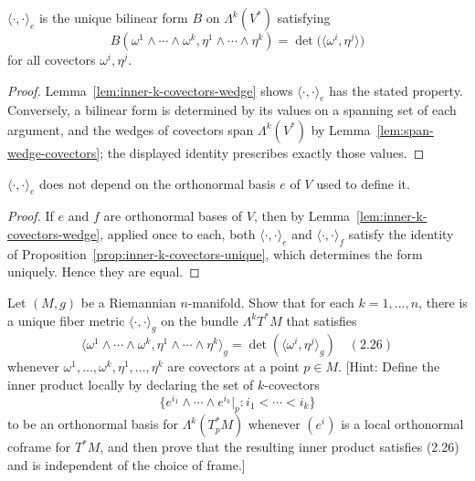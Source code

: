 \begin{proposition}
\label{prop:inner-k-covectors-unique}
\leanok
{}
$\langle \cdot, \cdot \rangle_e$ is the unique bilinear form $B$ on $\Lambda^k(V^*)$ satisfying
\[
B(\omega^1 \wedge \cdots \wedge \omega^k, \eta^1 \wedge \cdots \wedge \eta^k) = \det\big(\langle \omega^i, \eta^j\rangle\big)
\]
for all covectors $\omega^i, \eta^j$.
\end{proposition}
\begin{proof}
\leanok
{}
Lemma~\ref{lem:inner-k-covectors-wedge} shows $\langle \cdot, \cdot \rangle_e$ has the stated property. Conversely, a bilinear form is determined by its values on a spanning set of each argument, and the wedges of covectors span $\Lambda^k(V^*)$ by Lemma~\ref{lem:span-wedge-covectors}; the displayed identity prescribes exactly those values.
\end{proof}

\begin{proposition}
\label{prop:inner-k-covectors-frame-independent}
\leanok
{}
$\langle \cdot, \cdot \rangle_e$ does not depend on the orthonormal basis $e$ of $V$ used to define it.
\end{proposition}
\begin{proof}
\leanok
{}
If $e$ and $f$ are orthonormal bases of $V$, then by Lemma~\ref{lem:inner-k-covectors-wedge}, applied once to each, both $\langle \cdot, \cdot\rangle_e$ and $\langle \cdot, \cdot\rangle_f$ satisfy the identity of Proposition~\ref{prop:inner-k-covectors-unique}, which determines the form uniquely. Hence they are equal.
\end{proof}

\begin{exercise}
\label{prob:fiber-metric-exterior-powers}
Let $(M, g)$ be a Riemannian $n$-manifold. Show that for each $k = 1, \ldots, n$, there is a unique fiber metric $\langle \cdot, \cdot \rangle_g$ on the bundle $\Lambda^k T^* M$ that satisfies
\[
\langle \omega^1 \wedge \cdots \wedge \omega^k, \eta^1 \wedge \cdots \wedge \eta^k \rangle_g = \det\left(\langle \omega^i, \eta^j \rangle_g\right) \quad (2.26)
\]
whenever $\omega^1, \ldots, \omega^k, \eta^1, \ldots, \eta^k$ are covectors at a point $p \in M$. [Hint: Define the inner product locally by declaring the set of $k$-covectors
\[
\{e^{i_1} \wedge \cdots \wedge e^{i_k} |_p : i_1 < \cdots < i_k\}
\]
to be an orthonormal basis for $\Lambda^k(T_p^* M)$ whenever $(e^i)$ is a local orthonormal coframe for $T^* M$, and then prove that the resulting inner product satisfies (2.26) and is independent of the choice of frame.]
\end{exercise}

